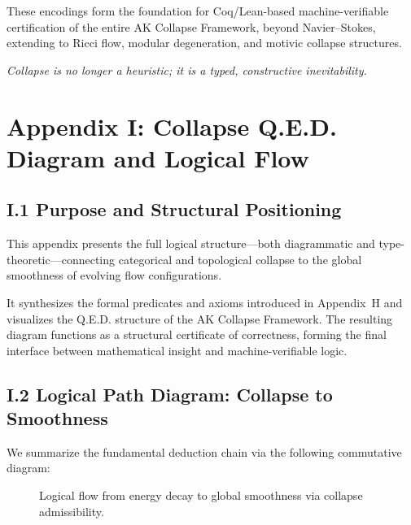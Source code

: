 \documentclass[11pt]{article}
\begin{document}
These encodings form the foundation for Coq/Lean-based machine-verifiable certification of the entire AK Collapse Framework, beyond Navier–Stokes, extending to Ricci flow, modular degeneration, and motivic collapse structures.

\begin{center}
\textit{Collapse is no longer a heuristic; it is a typed, constructive inevitability.}
\end{center}




\appendix
\section*{Appendix I: \texorpdfstring{Collapse Q.E.D. Diagram and Logical Flow}{Collapse Q.E.D. Diagram and Logical Flow}}

\subsection*{I.1 Purpose and Structural Positioning}

This appendix presents the full logical structure—both diagrammatic and type-theoretic—connecting categorical and topological collapse to the global smoothness of evolving flow configurations.

It synthesizes the formal predicates and axioms introduced in Appendix~H and visualizes the Q.E.D. structure of the AK Collapse Framework. The resulting diagram functions as a structural certificate of correctness, forming the final interface between mathematical insight and machine-verifiable logic.

\subsection*{I.2 Logical Path Diagram: Collapse to Smoothness}

We summarize the fundamental deduction chain via the following commutative diagram:

\begin{figure}[H]
\centering
{}
\caption{Logical flow from energy decay to global smoothness via collapse admissibility.}
\end{figure}
\end{document}
